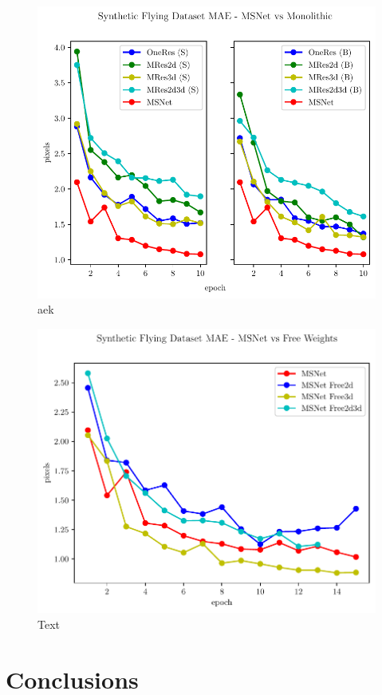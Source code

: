 \documentclass[10pt]{article}
\begin{document}
\begin{figure}
    \centering
    \includegraphics[width=\textwidth]{paper/latex/figures/freiburg_msnet_vs_monolithic_mae.pdf}
    \caption{aek}
    \label{fig:mae_SFNvsGenericNets}
\end{figure}


\begin{figure}
    \centering
    \includegraphics[width=\textwidth]{paper/latex/figures/freiburg_msnet_vs_free_weights_mae.pdf}
    \caption{Text}
    \label{fig:mae_SFNvsSFN_free_weights}
\end{figure}

\section{Conclusions}




\end{document}
